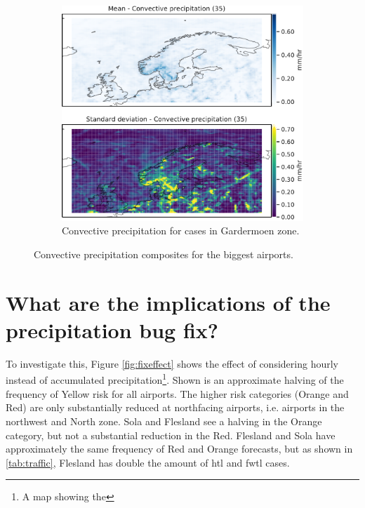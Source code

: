 \begin{figure}
    \begin{subfigure}[b]{0.5\textwidth}
    \centering
    \includegraphics[width=\textwidth]{Figures/cPENGM.pdf}
    \caption{Convective precipitation for cases in Gardermoen zone.}
    \label{fig:ENGMcP}
\end{subfigure}
\caption{Convective precipitation composites for the biggest airports. }
\label{fig:convectiveairports}
\end{figure}

\section{What are the implications of the precipitation bug fix?}

To investigate this, Figure \ref{fig:fixeffect} shows the effect of considering hourly instead of accumulated precipitation\footnote{A map showing the }. Shown is an approximate halving of the frequency of Yellow risk for all airports. The higher risk categories (Orange and Red) are only substantially reduced at northfacing airports, i.e. airports in the northwest and North zone. Sola and Flesland see a halving in the Orange category, but not a substantial reduction in the Red. Flesland and Sola have approximately the same frequency of Red and Orange forecasts, but as shown in \ref{tab:traffic}, Flesland has double the amount of \acrshort{htl} and \acrshort{fwtl} cases.

